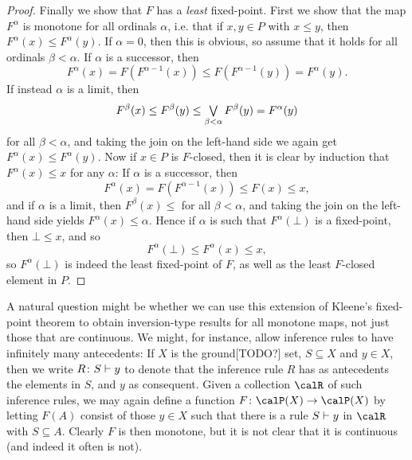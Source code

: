 \documentclass[a4paper, 11pt, article, danish, oneside]{memoir}
\DeclarePairedDelimiter{\auxdelimparen}{(}{)}
\newcommand{\powerset}[2][]{\calP\auxdelimparen[#1]{#2}}
\DeclareMathOperator*{\smallbigvee}{\textstyle\bigvee}
\DeclareMathOperator*{\bigjoin}{\mathchoice
    {\smallbigvee}%
    {\bigvee}%
    {\bigvee}%
    {\bigvee}%
}
\begin{document}
\begin{proof}
    Finally we show that $F$ has a \emph{least} fixed-point. First we show that the map $F^\alpha$ is monotone for all ordinals $\alpha$, i.e. that if $x,y \in P$ with $x \leq y$, then $F^\alpha(x) \leq F^\alpha(y)$. If $\alpha = 0$, then this is obvious, so assume that it holds for all ordinals $\beta < \alpha$. If $\alpha$ is a successor, then
    \begin{equation*}
        F^\alpha(x)
            = F(F^{\alpha-1}(x))
            \leq F(F^{\alpha-1}(y))
            = F^\alpha(y).
    \end{equation*}
    If instead $\alpha$ is a limit, then
    \begin{equation*}
        F^\beta(x)
            \leq F^\beta(y)
            \leq \bigjoin_{\beta < \alpha} F^\beta(y)
            = F^\alpha(y)
    \end{equation*}
    for all $\beta < \alpha$, and taking the join on the left-hand side we again get $F^\alpha(x) \leq F^\alpha(y)$. Now if $x \in P$ is $F$-closed, then it is clear by induction that $F^\alpha(x) \leq x$ for any $\alpha$: If $\alpha$ is a successor, then
    \begin{equation*}
        F^\alpha(x)
            = F(F^{\alpha-1}(x))
            \leq F(x)
            \leq x,
    \end{equation*}
    and if $\alpha$ is a limit, then $F^\beta(x) \leq $ for all $\beta < \alpha$, and taking the join on the left-hand side yields $F^\alpha(x) \leq \alpha$. Hence if $\alpha$ is such that $F^\alpha(\bot)$ is a fixed-point, then $\bot \leq x$, and so
    \begin{equation*}
        F^\alpha(\bot)
            \leq F^\alpha(x)
            \leq x,
    \end{equation*}
    so $F^\alpha(\bot)$ is indeed the least fixed-point of $F$, as well as the least $F$-closed element in $P$.
\end{proof}

A natural question might be whether we can use this extension of Kleene's fixed-point theorem to obtain inversion-type results for all monotone maps, not just those that are continuous. We might, for instance, allow inference rules to have infinitely many antecedents: If $X$ is the ground[TODO?] set, $S \subseteq X$ and $y \in X$, then we write $\myinfrule{R}{S}{y}$ to denote that the inference rule $R$ has as antecedents the elements in $S$, and $y$ as consequent. Given a collection $\calR$ of such inference rules, we may again define a function $F \colon \powerset{X} \to \powerset{X}$ by letting $F(A)$ consist of those $y \in X$ such that there is a rule $\myinfrule{}{S}{y}$ in $\calR$ with $S \subseteq A$. Clearly $F$ is then monotone, but it is not clear that it is continuous (and indeed it often is not).
\end{document}

